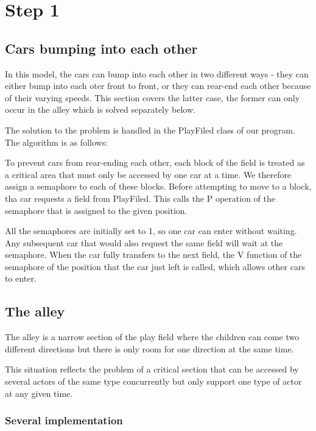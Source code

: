 


\section{Step 1}

\subsection{Cars bumping into each other} %

In this model, the cars can bump into each other in two different ways - they can either bump into each oter front to front, or they can rear-end each other because of their varying speeds. This section covers the latter case, the former can only occur in the alley which is solved separately below.

The solution to the problem is handled in the PlayFiled class of our program. The algorithm is as follows:

To prevent cars from rear-ending each other, each block of the field is treated as a critical area that must only be accessed by one car at a time. We therefore assign a semaphore to each of these blocks. Before attempting to move to a block, tha car requests a field from PlayFiled. This calls the P operation of the semaphore that is assigned to the given position. 

All the semaphores are initially set to 1, so one car can enter without waiting. Any subsequent car that would also request the same field will wait at the semaphore. When the car fully transfers to the next field, the V function of the semaphore of the position that the car just left is called, which allows other cars to enter.




\subsection{The alley} %

The alley is a narrow section of the play field where the children can come two
different directions but there is only room for one direction at the same time.

This situation reflects the problem of a critical section that can be accessed
by several actors of the same type concurrently but only support one type of
actor at any given time.

\subsubsection{Several implementation}

